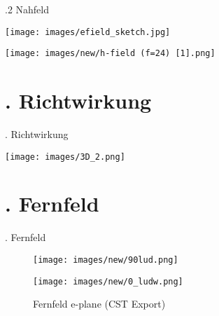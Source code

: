 \documentclass[
  aspectratio=169, %
]{beamer}
\begin{document}
\begin{frame}{\thesection.2 Nahfeld}
    \begin{minipage}[t]{0.48\textwidth}
        \centering
        \texttt{[image: images/efield\_sketch.jpg]}
    \end{minipage}
    \hfill
    \begin{minipage}[t]{0.48\textwidth}
        \centering
        \texttt{[image: images/new/h-field (f=24) [1].png]}
    \end{minipage}
\end{frame}

\section{\thesection. Richtwirkung}
\begin{frame}{\thesection. Richtwirkung}
    \centering
    \begin{minipage}[t]{\textwidth}
        \texttt{[image: images/3D\_2.png]}
        \label{fig:richtwirkung}
    \end{minipage}
\end{frame}

\section{\thesection. Fernfeld}
\begin{frame}{\thesection. Fernfeld}
    \begin{figure}
        \centering
        \begin{minipage}[t]{0.49\textwidth}
            \centering
            \texttt{[image: images/new/90lud.png]}
            \caption{Fernfeld h-plane (CST Export)}
        \end{minipage}
        \hfill
        \begin{minipage}[t]{0.49\textwidth}
            \centering
            \texttt{[image: images/new/0\_ludw.png]}
            \caption{Fernfeld e-plane (CST Export)}
        \end{minipage}
    \end{figure}
\end{frame}
\end{document}
